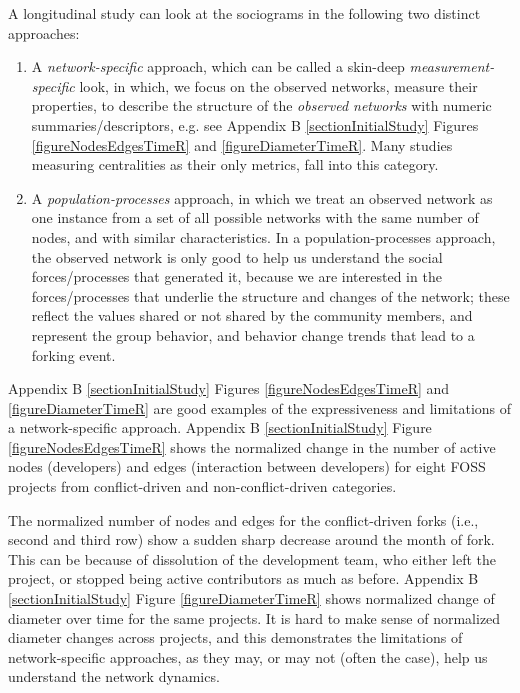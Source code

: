 \documentclass[12pt,letterpaper]{gthesis2}  %
\begin{document}
A longitudinal study can look at the sociograms in the following two distinct approaches: 
\begin{enumerate}
\item A \textit{network-specific} approach, which can be called a skin-deep \textit{measurement-specific} look, in which, we focus on the observed networks, measure their properties, to describe the structure of the \textit{observed networks} with numeric summaries/descriptors, e.g. see Appendix B \ref{sectionInitialStudy}
Figures \ref{figureNodesEdgesTimeR} and \ref{figureDiameterTimeR}. Many studies measuring centralities as their only metrics, fall into this category. 

\item A \textit{population-processes} approach, in which we treat an observed network as one instance from a set of all possible networks with the same number of nodes, and with similar characteristics. In a population-processes approach, the observed network is only good to help us understand the social forces/processes that generated it, because we are interested in the forces/processes that underlie the structure and changes of the network; these reflect the values shared or not shared by the community members, and represent the group behavior, and behavior change trends that lead to a forking event. 

\end{enumerate}

Appendix B \ref{sectionInitialStudy} Figures \ref{figureNodesEdgesTimeR} and \ref{figureDiameterTimeR} are good examples of the expressiveness and limitations of a network-specific approach. Appendix B \ref{sectionInitialStudy} Figure \ref{figureNodesEdgesTimeR} shows the normalized change in the number of active nodes (developers) and edges (interaction between developers) for eight FOSS projects from conflict-driven and non-conflict-driven categories. 

The normalized number of nodes and edges for the conflict-driven forks (i.e., second and third row) show a sudden sharp decrease around the month of fork. This can be because of dissolution of the development team, who either left the project, or stopped being active contributors as much as before. Appendix B \ref{sectionInitialStudy} Figure \ref{figureDiameterTimeR} shows normalized change of diameter over time for the same projects. It is hard to make sense of normalized diameter changes across projects, and this demonstrates the limitations of network-specific approaches, as they may, or may not (often the case), help us understand the network dynamics.
\end{document}
